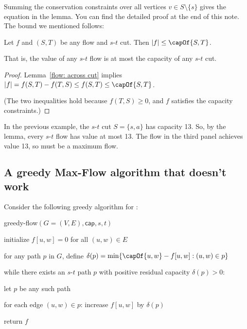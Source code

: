Summing the conservation constraints
over all vertices $v\in S\setminus\{s\}$ gives the equation in the lemma.
You can find the detailed proof at the end of this note.
The bound we mentioned follows:
\begin{lemma}\label{flow: weak}
  Let $f$ and $(S,T)$ be any flow and $s$-$t$ cut.
  Then $|f| \le \capOf {S, T}$.

  That is, the value of any $s$-$t$ flow is at most the capacity of any $s$-$t$ cut.
\end{lemma}
\begin{proof}
  Lemma~\ref{flow: across cut} implies
  $|f| = f(S,T) - f(T,S) \le f(S, T) \le \capOf {S, T}$.

  (The two inequalities hold because $f(T, S) \ge 0$,
  and $f$ satisfies the capacity constraints.)
\end{proof}

In the previous example,
the $s$-$t$ cut $S=\{s,a\}$ has capacity 13.
So, by the lemma, every $s$-$t$ flow has value at most 13.
The flow in the third panel achieves value 13,
so must be a maximum flow.

\subsection{A greedy Max-Flow algorithm that doesn't work}
Consider the following greedy algorithm for :

\begin{myframed}
\begin{steps}
  \item[] {\sf greedy-flow}$(G=(V,E), \textsf{cap}, s, t)$

    \step initialize $f[u, w] = 0$ for all $(u,w)\in E$

    \step for any path $p$ in $G$,
    define $\delta(p) = \min\{ \capOf {u,w} - f[u,w] : (u,w) \in p\}$

    \step while there exists an $s$-$t$ path $p$
    with positive residual capacity $\delta(p)>0$:

    \begin{block}
      \step let $p$ be any such path

      \step for each edge $(u,w)\in p$: increase $f[u,w]$ by $\delta(p)$
    \end{block}

    \step return $f$
  \end{steps}
\end{myframed}

